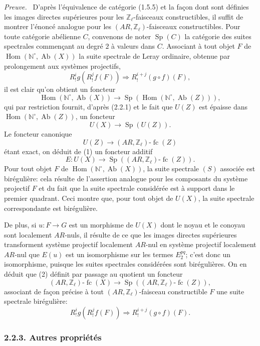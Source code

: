 \documentclass[11pt]{article}
\newenvironment{prooftext}[1][Proof]{\par\noindent\emph{#1.}\ }{\par\medskip}
\DeclareMathOperator{\Hom}{Hom}
\providecommand{\Hom}{\operatorname{Hom}}
\providecommand{\Sp}{\operatorname{Sp}}
\providecommand{\Ab}{\operatorname{Ab}}
\providecommand{\fc}{\operatorname{fc}}
\providecommand{\Ab}{\operatorname{Ab}}
\providecommand{\Hom}{\operatorname{Hom}}
\begin{document}
\begin{prooftext}[Preuve]
D'après l'équivalence de catégorie (1.5.5) et la façon dont sont définies les images directes supérieures pour les \(\mathbb Z_\ell\)-faisceaux constructibles, il suffit de montrer l'énoncé analogue pour les \((AR,\mathbb Z_\ell)\)-faisceaux constructibles. Pour toute catégorie abélienne \(C\), convenons de noter \(\Sp(C)\) la catégorie des suites spectrales commençant au degré \(2\) à valeurs dans \(C\). Associant à tout objet \(F\) de \(\Hom(\mathbb N^\circ,\Ab(X))\) la suite spectrale de Leray ordinaire, obtenue par prolongement aux systèmes projectifs,
\[
R^i_! g(R^j_! f(F))\Longrightarrow R^{i+j}_!(g\circ f)(F),
\tag{S}
\]
il est clair qu'on obtient un foncteur
\[
\Hom(\mathbb N^\circ,\Ab(X))\longrightarrow \Sp(\Hom(\mathbb N^\circ,\Ab(Z))),
\]
qui par restriction fournit, d'après (2.2.1) et le fait que \(U(Z)\) est épaisse dans \(\Hom(\mathbb N^\circ,\Ab(Z))\), un foncteur
\[
U(X)\longrightarrow \Sp(U(Z)).
\tag{1}
\]
Le foncteur canonique
\[
U(Z)\longrightarrow (AR,\mathbb Z_\ell)\text{-}\fc(Z)
\]
étant exact, on déduit de (1) un foncteur additif
\[
E:U(X)\longrightarrow \Sp((AR,\mathbb Z_\ell)\text{-}\fc(Z)).
\tag{2}
\]
Pour tout objet \(F\) de \(\Hom(\mathbb N^\circ,\Ab(X))\), la suite spectrale \((S)\) associée est birégulière: cela résulte de l'assertion analogue pour les composants du système projectif \(F\) et du fait que la suite spectrale considérée est à support dans le premier quadrant. Ceci montre que, pour tout objet de \(U(X)\), la suite spectrale correspondante est birégulière.

De plus, si \(u:F\to G\) est un morphisme de \(U(X)\) dont le noyau et le conoyau sont localement \(AR\)-nuls, il résulte de ce que les images directes supérieures transforment système projectif localement \(AR\)-nul en système projectif localement \(AR\)-nul que \(E(u)\) est un isomorphisme sur les termes \(E_2^{pq}\); c'est donc un isomorphisme, puisque les suites spectrales considérées sont birégulières. On en déduit que (2) définit par passage au quotient un foncteur
\[
(AR,\mathbb Z_\ell)\text{-}\fc(X)
\longrightarrow \Sp((AR,\mathbb Z_\ell)\text{-}\fc(Z)),
\tag{3}
\]
associant de façon précise à tout \((AR,\mathbb Z_\ell)\)-faisceau constructible \(F\) une suite spectrale birégulière:
\[
R^i_!g(R^j_!f(F))\Longrightarrow R^{i+j}_!(g\circ f)(F).
\]
\end{prooftext}

\subsubsection*{2.2.3. Autres propriétés}
\end{document}

